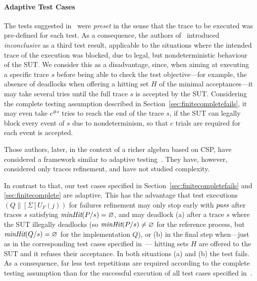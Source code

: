 \paragraph{Adaptive Test Cases} The tests suggested
in~\cite{Hennessy:1988:ATP:50497,DBLP:conf/icfem/CavalcantiG07} were
\emph{preset} in the sense that the trace to be executed was pre-defined for
each test. As a consequence, the authors
of~\cite{DBLP:conf/icfem/CavalcantiG07} introduced \emph{inconclusive} as a
third test result, applicable to the situations where the intended trace of
the execution was blocked, due to legal, but nondeterministic behaviour of
the SUT. We consider this as a disadvantage, since, when aiming at executing
a specific trace $s$ before being able to check the test objective---for
example, the absence of deadlocks when offering a hitting set $H$ of the
minimal acceptances---it may take several tries until the full trace $s$ is
accepted by the SUT. Considering the complete testing assumption described in
Section~\ref{sec:finitecompletefails}, it may even take $c^{\#s}$ tries to
reach the end of the trace $s$, if the SUT can legally block every event of
$s$ due to nondeterminism, so that $c$ trials are required for each event is
accepted.

Those authors, later, in the context of a richer algebra based on CSP, have
considered a framework similar to adaptive testing~\cite{CG15}.  They have,
however, considered only traces refinement, and have not studied complexity.

In  contrast to that, our test cases specified in
Section~\ref{sec:finitecompletefails} and \ref{sec:finitecomplete} are
adaptive. This has the advantage that test executions $(Q\parallel[\Sigma]
U_F(j))$ for failures refinement may only stop early with ${\text{\it pass}}$ after
traces $s$ satisfying $\text{\it minHit}(P/s) = \varnothing$, and may deadlock (a)
after a trace $s$ where the SUT illegally deadlocks (so $\text{\it minHit}(P/s) \neq
\varnothing$ for the reference process, but $\text{\it minHit}(Q/s) = \varnothing$ for
the implementation $Q$), or (b) in the final step when---just as in the
corresponding test cases specified in~\cite{DBLP:conf/icfem/CavalcantiG07}---
hitting sets $H$ are offered to the SUT and it refuses their acceptance. In
both situations (a) and (b) the test fails. As a consequence, far less test
repetitions are required according to the complete testing assumption than
for the successful execution of all test cases specified
in~\cite{DBLP:conf/icfem/CavalcantiG07}.

